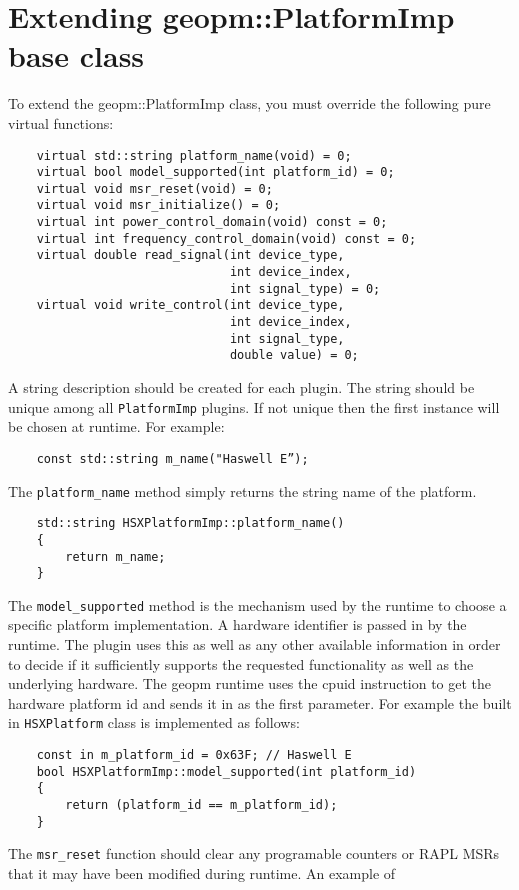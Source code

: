 \documentclass[11pt]{article}
\begin{document}
\section{Extending geopm::PlatformImp base class}
To extend the geopm::PlatformImp class, you must override the
following pure virtual functions:
\begin{verbatim}
    virtual std::string platform_name(void) = 0;
    virtual bool model_supported(int platform_id) = 0;
    virtual void msr_reset(void) = 0;
    virtual void msr_initialize() = 0;
    virtual int power_control_domain(void) const = 0;
    virtual int frequency_control_domain(void) const = 0;
    virtual double read_signal(int device_type,
                               int device_index,
                               int signal_type) = 0;
    virtual void write_control(int device_type,
                               int device_index,
                               int signal_type,
                               double value) = 0;
\end{verbatim}
A string description should be created for each plugin. The string
should be unique among all \verb#PlatformImp# plugins. If not unique
then the first instance will be chosen at runtime. For example:
\begin{verbatim}
    const std::string m_name("Haswell E”);
\end{verbatim}
The \verb#platform_name# method simply returns the string name of the
platform.
\begin{verbatim}
    std::string HSXPlatformImp::platform_name()
    {
        return m_name;
    }
\end{verbatim}
The \verb#model_supported# method is the mechanism used by the runtime
to choose a specific platform implementation. A hardware identifier is
passed in by the runtime. The plugin uses this as well as any other
available information in order to decide if it sufficiently supports
the requested functionality as well as the underlying hardware. The
geopm runtime uses the cpuid instruction to get the hardware platform
id and sends it in as the first parameter. For example the built in
\verb#HSXPlatform# class is implemented as follows:
\begin{verbatim}
    const in m_platform_id = 0x63F; // Haswell E
    bool HSXPlatformImp::model_supported(int platform_id)
    {
        return (platform_id == m_platform_id);
    }
\end{verbatim}
The \verb#msr_reset# function should clear any programable counters or
RAPL MSRs that it may have been modified during runtime. An example of
\end{document}

